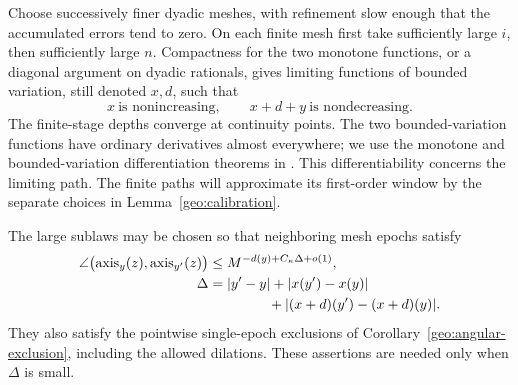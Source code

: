 Choose successively finer dyadic meshes, with refinement
slow enough that the accumulated errors tend to zero.
On each finite mesh first take sufficiently large \(i\),
then sufficiently large \(n\).  Compactness for the two
monotone functions, or a diagonal argument on dyadic
rationals, gives limiting functions of bounded variation,
still denoted \(x,d\), such that
\[
x\ \text{is nonincreasing},\qquad
x+d+y\ \text{is nondecreasing}.
\]
The finite-stage depths converge at continuity points.  The two
bounded-variation functions have ordinary derivatives almost
everywhere; we use the monotone and bounded-variation differentiation
theorems in \cite[Theorem~1.6.25 and Corollary~1.6.35]{Tao2011Measure}.
This differentiability concerns the limiting path.  The finite paths
will approximate its first-order window by the separate choices in
Lemma~\ref{geo:calibration}.

\begin{lemma}\label{geo:axis-stability}
The large sublaws may be chosen so that neighboring mesh
epochs satisfy
\begin{equation}\label{eq:source-8}
\begin{split}
\angle\bigl(\operatorname{axis}_{y}(z),
            \operatorname{axis}_{y'}(z)\bigr)
&\le M^{-d(y)+C_\kappa\Delta+o(1)},\\
\Delta&=|y'-y|+|x(y')-x(y)|\\
&\hspace{1.5cm}
+|(x+d)(y')-(x+d)(y)|.
\end{split}
\end{equation}
They also satisfy the pointwise single-epoch exclusions of
Corollary~\ref{geo:angular-exclusion}, including the allowed
dilations.  These assertions are needed only when
\(\Delta\) is small.
\end{lemma}


